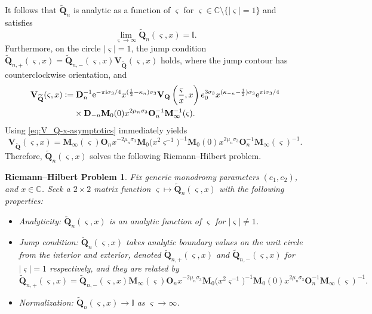 \documentclass[pdftex]{sigma}
\numberwithin{equation}{section}
\newtheorem{rhp}[Theorem]{Riemann--Hilbert Problem}
\newcommand{\ee}{\mathrm{e}}
\newcommand{\ii}{\mathrm{i}}
\newcommand{\C}{{\mathbb{C}}}
\begin{document}
It follows that $\widetilde{\mathbf{Q}}_n$ is analytic as a function of $\varsigma$ for $\varsigma \in \C \setminus \{|\varsigma| = 1 \}$ and satisfies
\[
\lim_{\varsigma \to \infty} \widetilde{\mathbf{Q}}_n(\varsigma, x) = \mathbb{I}.
\]
Furthermore, on the circle $|\varsigma| = 1$, the jump condition $\widetilde{\mathbf{Q}}_{n,+}(\varsigma,x)=\widetilde{\mathbf{Q}}_{n,-}(\varsigma,x)\mathbf{V}_{\widetilde{\mathbf{Q}}}(\varsigma,x)$ holds, where the jump contour has counterclockwise orientation, and
\begin{align*}
&\mathbf{V}_{\widetilde{\mathbf{Q}}}(\varsigma,x) := \mathbf{D}_n^{-1} \ee^{-\pi \ii \sigma_3/4} x^{(\frac{1}{2} - \kappa_n)\sigma_3} \mathbf{V}_{\mathbf{Q}}\left(\frac{\varsigma}{x},x\right) e_0^{3\sigma_3} x^{(\kappa_{-n} - \frac{1}{2})\sigma_3} \ee^{\pi \ii \sigma_3 /4}\\
&\hphantom{\mathbf{V}_{\widetilde{\mathbf{Q}}}(\varsigma,x) :=}{} \times \mathbf{D}_{-n} \mathbf{M}_0(0)x^{2\mu_n \sigma_3} \mathbf{O}_n^{-1} \mathbf{M}_\infty^{-1}(\varsigma).
\end{align*}
Using \eqref{eq:V_Q-x-asymptotics} immediately yields
\begin{equation*}
 \mathbf{V}_{\widetilde{\mathbf{Q}}}(\varsigma,x)= \mathbf{M}_\infty(\varsigma)\mathbf{O}_n x^{-2\mu_n\sigma_3}
 \mathbf{M}_0\big( {x^2}\varsigma^{-1}\big)^{-1}\mathbf{M}_0( 0)x^{2\mu_n\sigma_3}\mathbf{O}_n^{-1} \mathbf{M}_\infty(\varsigma)^{-1}.
\end{equation*}
Therefore, $\widetilde{\mathbf{Q}}_n(\varsigma,x)$ solves the following Riemann--Hilbert problem.
\begin{rhp}\label{rhp:Q-tilde}
Fix generic monodromy parameters $( e_1, e_2)$, and $x\in\mathbb{C}$. Seek a $2\times 2$ matrix function $\varsigma\mapsto \widetilde{\mathbf{Q}}_n(\varsigma,x)$ with the following properties:
\begin{itemize}\itemsep=0pt \samepage
 \item Analyticity: $\widetilde{\mathbf{Q}}_n(\varsigma,x)$ is an analytic function of $\varsigma$ for $|\varsigma|\neq 1$.
 \item Jump condition:
 $\widetilde{\mathbf{Q}}_n(\varsigma,x)$ takes analytic boundary values on the unit circle from the interior and exterior, denoted $\widetilde{\mathbf{Q}}_{n,+}(\varsigma,x)$ and $\widetilde{\mathbf{Q}}_{n,-}(\varsigma,x)$ for $|\varsigma|=1$ respectively, and they are related by
 \begin{equation*}
 \widetilde{\mathbf{Q}}_{n,+}(\varsigma,x)=\widetilde{\mathbf{Q}}_{n,-}(\varsigma,x)\mathbf{M}_\infty(\varsigma)\mathbf{O}_n x^{-2\mu_n\sigma_3}
 \mathbf{M}_0\big( {x^2}\varsigma^{-1}\big)^{-1}\mathbf{M}_0( 0)x^{2\mu_n\sigma_3}\mathbf{O}_n^{-1} \mathbf{M}_\infty(\varsigma)^{-1}.
 \end{equation*}
 \item Normalization:
 $\widetilde{\mathbf{Q}}_n(\varsigma,x)\to\mathbb{I}$ as $\varsigma\to\infty$.
\end{itemize}
\end{rhp}
\end{document}
